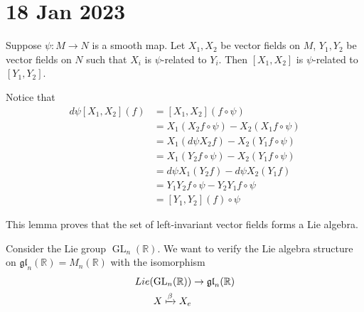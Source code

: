 \documentclass[11pt,a4paper]{scrarticle}
\theoremstyle{definition}
\renewenvironment{proof}[1][\proofname]{\vspace{-15pt}\begin{myproof}}{\end{myproof}}
\theoremstyle{greenbox}
\newcommand{\R}{\mathbb{R}}
\begin{document}
    \section{18 Jan 2023}
    \vspace{2pt}
    \begin{lemma}
        Suppose $ \psi : M \to N  $ is a smooth map. Let $ X_{1},X_{2} $ be vector fields on $ M $, $ Y_{1},Y_{2} $ be vector fields on $ N $ such that $ X_{i} $ is $ \psi $-related to $ Y_{i} $. Then $ [X_{1},X_{2}]  $ is $ \psi $-related to $ [Y_{1},Y_{2}] $.
    \end{lemma}
    \begin{proof}
        Notice that \begin{align*}
            d \psi [X_{1},X_{2}](f) & = [X_{1},X_{2}]( f\circ \psi) \\
            & = X_{1}(X_{2} f \circ \psi) - X_{2}(X_{1} f\circ \psi) \\
            & = X_{1}( d \psi X_{2}f) -X_{2}(Y_{1} f \circ \psi) \\
            & = X_{1}(Y_{2} f \circ \psi) - X_{2}(Y_{1} f\circ \psi) \\
            & = d \psi X_{1}(Y_{2}f)- d \psi X_{2}(Y_{1}f) \\
            & = Y_{1}Y_{2} f\circ \psi - Y_{2}Y_{1}f \circ \psi \\
            & = [Y_{1},Y_{2}](f)\circ \psi
        \end{align*}
    \end{proof}
    This lemma proves that the set of left-invariant vector fields forms a Lie algebra. 

    Consider the Lie group $ \operatorname{GL}_{n}(\R) $. We want to verify the Lie algebra structure on $ \mathfrak{gl}_{n}(\R)  = M_{n}(\R)$ with the isomorphism \begin{align*}
        Lie(\operatorname{GL}_{n}(\R)) & \to \mathfrak{gl}_{n}(\R)\\ 
        X \xmapsto[]{\beta} X_{e}
    \end{align*}
\end{document}
